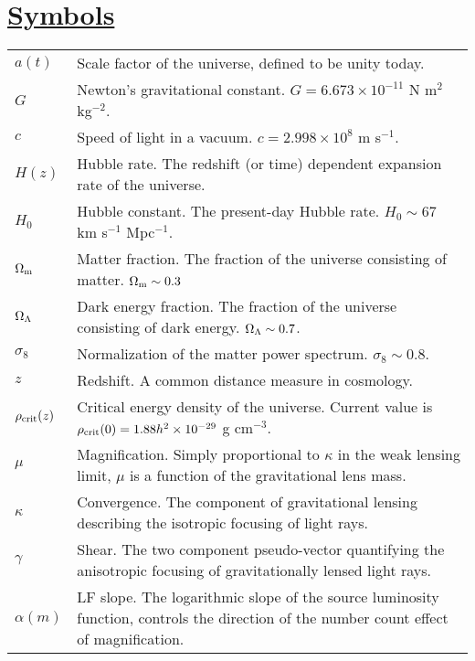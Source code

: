 \begin{acronym}[CFHTLenS]
\end{acronym}


\section*{\underline{Symbols}}

\begin{tabular}{ll}
$a(t)$ & Scale factor of the universe, defined to be unity today. \\
$G$ & Newton's gravitational constant. $G = 6.673 \times 10^{-11}$ N m$^2$ kg$^{-2}$.\\
$c$ & Speed of light in a vacuum. $c = 2.998 \times 10^8$ m s$^{-1}$. \\
$H(z)$ & Hubble rate. The redshift (or time) dependent expansion rate of the universe. \\
$H_0$ & Hubble constant. The present-day Hubble rate. $H_0 \sim 67$ km s$^{-1}$ Mpc$^{-1}$. \\
$\Omega_{\rm m}$ & Matter fraction. The fraction of the universe consisting of matter. $\Omega_{\rm m} \sim 0.3$ \\
$\Omega_{\rm \Lambda}$ & Dark energy fraction. The fraction of the universe consisting of dark energy. $\Omega_{\rm \Lambda} \sim 0.7$. \\
$\sigma_8$ & Normalization of the matter power spectrum.  $\sigma_8 \sim 0.8$.\\
$z$ & Redshift. A common distance measure in cosmology. \\
$\rho_{\rm crit}(z)$ & Critical energy density of the universe. Current value is $\rho_{\rm crit}(0) = 1.88h^2 \times 10^{-29}$ g cm$^{-3}$. \\
$\mu$ & Magnification. Simply proportional to $\kappa$ in the weak lensing limit, $\mu$ is a function of the gravitational lens mass. \\
$\kappa$ & Convergence. The component of gravitational lensing describing the isotropic focusing of light rays. \\
$\gamma$ & Shear. The two component pseudo-vector quantifying the anisotropic focusing of gravitationally lensed light rays. \\
$\alpha(m)$ & \acs{LF} slope. The logarithmic slope of the source luminosity function, controls the direction of the number count effect of magnification. \\
\end{tabular}

